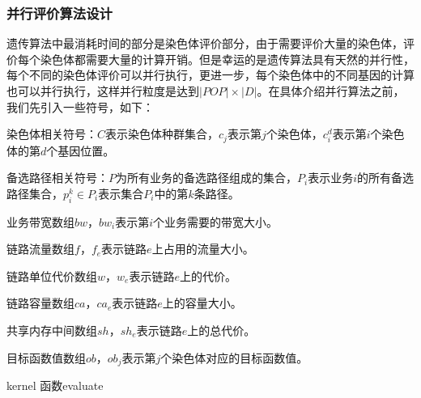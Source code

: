 \subsubsection{并行评价算法设计}
遗传算法中最消耗时间的部分是染色体评价部分，由于需要评价大量的染色体，评价每个染色体都需要大量的计算开销。但是幸运的是遗传算法具有天然的并行性，每个不同的染色体评价可以并行执行，更进一步，每个染色体中的不同基因的计算也可以并行执行，这样并行粒度是达到$|POP|\times|D|$。在具体介绍并行算法之前，我们先引入一些符号，如下：

染色体相关符号：$C$表示染色体种群集合，$c_j$表示第$j$个染色体，$c^d_i$表示第$i$个染色体的第$d$个基因位置。

备选路径相关符号：$P$为所有业务的备选路径组成的集合，$P_i$表示业务$i$的所有备选路径集合，$p_i^k \in P_i$表示集合$P_i$中的第$k$条路径。

业务带宽数组$bw$，$bw_i$表示第$i$个业务需要的带宽大小。

链路流量数组$f$，$f_e$表示链路$e$上占用的流量大小。

链路单位代价数组$w$，$w_e$表示链路$e$上的代价。

链路容量数组$ca$，$ca_e$表示链路$e$上的容量大小。

共享内存中间数组$sh$，$sh_e$表示链路$e$上的总代价。

目标函数值数组$ob$，$ob_j$表示第$j$个染色体对应的目标函数值。

\begin{algorithm}[t]
\begin{algorithmic}[1]
\EndFor
{}
\Else
{}
\EndIf
{}
\EndIf
{}
\EndWhile
{}
\EndFunction
\end{algorithmic}
\caption{kernel 函数evaluate}
\label{evaluate}
\end{algorithm}

